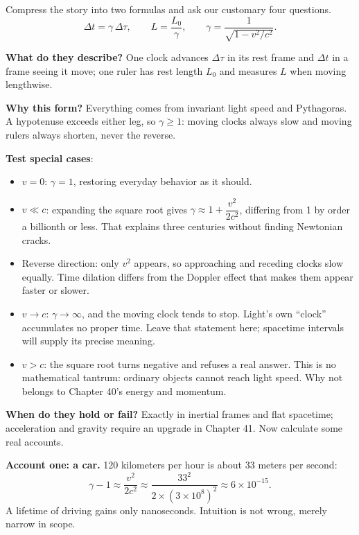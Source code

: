 
\begin{mainline}
Compress the story into two formulas and ask our customary four questions.
\[
\Delta t=\gamma\,\Delta\tau,\qquad
L=\frac{L_0}{\gamma},\qquad
\gamma=\frac{1}{\sqrt{1-v^{2}/c^{2}}}.
\]

\textbf{What do they describe?} One clock advances \(\Delta\tau\) in its rest frame and \(\Delta t\) in a frame seeing it move; one ruler has rest length \(L_0\) and measures \(L\) when moving lengthwise.

\textbf{Why this form?} Everything comes from invariant light speed and Pythagoras. A hypotenuse exceeds either leg, so \(\gamma\ge 1\): moving clocks always slow and moving rulers always shorten, never the reverse.

\textbf{Test special cases}:
\begin{itemize}[leftmargin=1.6em]
  \item \(v=0\): \(\gamma=1\), restoring everyday behavior as it should.
  \item \(v\ll c\): expanding the square root gives \(\gamma\approx 1+\dfrac{v^{2}}{2c^{2}}\), differing from 1 by order a billionth or less. That explains three centuries without finding Newtonian cracks.
  \item Reverse direction: only \(v^{2}\) appears, so approaching and receding clocks slow equally. Time dilation differs from the Doppler effect that makes them appear faster or slower.
  \item \(v\to c\): \(\gamma\to\infty\), and the moving clock tends to stop. Light's own ``clock'' accumulates no proper time. Leave that statement here; spacetime intervals will supply its precise meaning.
  \item \(v>c\): the square root turns negative and refuses a real answer. This is no mathematical tantrum: ordinary objects cannot reach light speed. Why not belongs to Chapter 40's energy and momentum.
\end{itemize}

\textbf{When do they hold or fail?} Exactly in inertial frames and flat spacetime; acceleration and gravity require an upgrade in Chapter 41. Now calculate some real accounts.

\textbf{Account one: a car.} 120 kilometers per hour is about 33 meters per second:
\[
\gamma-1\approx\frac{v^{2}}{2c^{2}}\approx\frac{33^{2}}{2\times(3\times10^{8})^{2}}\approx 6\times10^{-15}.
\]
A lifetime of driving gains only nanoseconds. Intuition is not wrong, merely narrow in scope.


\end{mainline}
